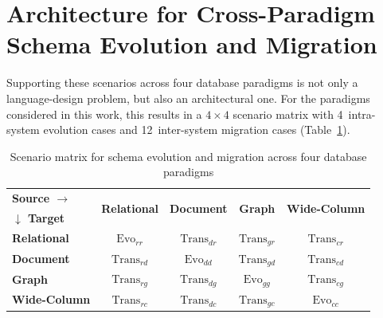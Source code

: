 \documentclass{llncs}
\begin{document}
\section{Architecture for Cross-Paradigm Schema Evolution and Migration}
\label{sec:model-based-transformation}

Supporting these scenarios across four database paradigms is not only a language-design problem, but also an architectural one. For the paradigms considered in this work, this results in a $4 \times 4$ scenario matrix with 4~intra-system evolution cases and 12~inter-system migration cases (Table~\ref{tab:migration-matrix}).


\begin{table}[htbp]
  \centering
  \caption{Scenario matrix for schema evolution and migration across four database paradigms}
  \label{tab:migration-matrix}
  \begin{tabular}{l c c c c}
  \toprule
  \textbf{Source $\rightarrow$} & \multirow{2}{*}{\textbf{Relational}} & \multirow{2}{*}{\textbf{Document}} & \multirow{2}{*}{\textbf{Graph}} &
  \multirow{2}{*}{\textbf{Wide-Column}} \\
  \textbf{$\downarrow$ Target} & & & & \\
  \midrule
  \textbf{Relational} & \cellcolor{evocolor}$\text{Evo}_{rr}$ & \cellcolor{migcolor}$\text{Trans}_{dr}$ & \cellcolor{migcolor}$\text{Trans}_{gr}$ & \cellcolor{migcolor}$\text{Trans}_{cr}$ \\
  \textbf{Document}   & \cellcolor{migcolor}$\text{Trans}_{rd}$ & \cellcolor{evocolor}$\text{Evo}_{dd}$ & \cellcolor{migcolor}$\text{Trans}_{gd}$ & \cellcolor{migcolor}$\text{Trans}_{cd}$ \\
  \textbf{Graph}      & \cellcolor{migcolor}$\text{Trans}_{rg}$ & \cellcolor{migcolor}$\text{Trans}_{dg}$ & \cellcolor{evocolor}$\text{Evo}_{gg}$ & \cellcolor{migcolor}$\text{Trans}_{cg}$ \\
  \textbf{Wide-Column}   & \cellcolor{migcolor}$\text{Trans}_{rc}$ & \cellcolor{migcolor}$\text{Trans}_{dc}$ & \cellcolor{migcolor}$\text{Trans}_{gc}$ & \cellcolor{evocolor}$\text{Evo}_{cc}$ \\
  \bottomrule
  \end{tabular}
\end{table}
\end{document}

